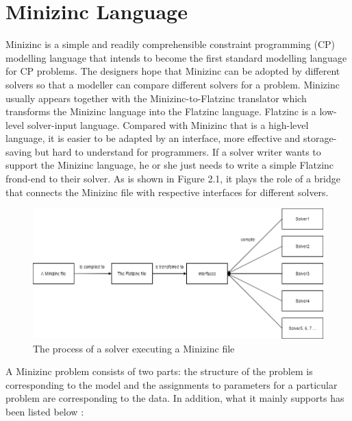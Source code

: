 \section{Minizinc Language}
Minizinc \cite{r10} is a simple and readily comprehensible constraint programming (CP) modelling language that intends to become the first standard modelling language for CP problems. The designers hope that Minizinc can be adopted by different solvers so that a modeller can compare different solvers for a problem. Minizinc usually appears together with the Minizinc-to-Flatzinc translator which transforms the Minizinc language into the Flatzinc language. Flatzinc \cite{r10} is a low-level solver-input language. Compared with Minizinc that is a high-level language, it is easier to be adapted by an interface, more effective and storage-saving but hard to understand for programmers. If a solver writer wants to support the Minizinc language, he or she just needs to write a simple Flatzinc frond-end to their solver. As is shown in Figure 2.1, it plays the role of a bridge that connects the Minizinc file with respective interfaces for different solvers. 
\begin{figure}[htbp]
\centering
\includegraphics[width=0.8\linewidth]{figs/flowofMinizinc.png}
\caption{The process of a solver executing a Minizinc file}
  \label{fig:process}
\end{figure}
A Minizinc problem consists of two parts: the structure of the problem is corresponding to the model and the assignments to parameters for a particular problem are corresponding to the data. In addition, what it mainly supports has been listed below \cite{r10}:\\
